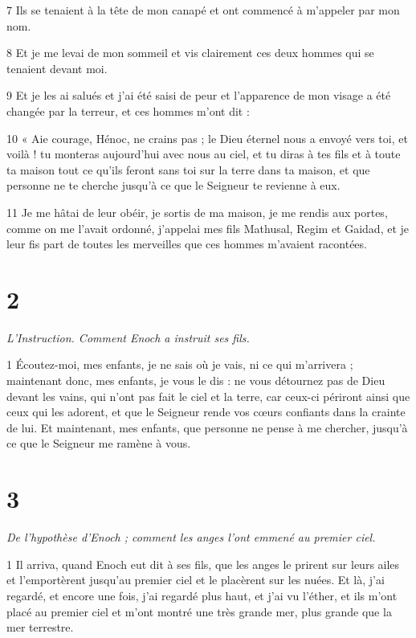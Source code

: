 \par 7 Ils se tenaient à la tête de mon canapé et ont commencé à m'appeler par mon nom.

\par 8 Et je me levai de mon sommeil et vis clairement ces deux hommes qui se tenaient devant moi.

\par 9 Et je les ai salués et j'ai été saisi de peur et l'apparence de mon visage a été changée par la terreur, et ces hommes m'ont dit :

\par 10 « Aie courage, Hénoc, ne crains pas ; le Dieu éternel nous a envoyé vers toi, et voilà ! tu monteras aujourd'hui avec nous au ciel, et tu diras à tes fils et à toute ta maison tout ce qu'ils feront sans toi sur la terre dans ta maison, et que personne ne te cherche jusqu'à ce que le Seigneur te revienne à eux.

\par 11 Je me hâtai de leur obéir, je sortis de ma maison, je me rendis aux portes, comme on me l'avait ordonné, j'appelai mes fils Mathusal, Regim et Gaidad, et je leur fis part de toutes les merveilles que ces hommes m'avaient racontées.

\chapter{2}

\par \textit{L'Instruction. Comment Enoch a instruit ses fils.}

\par 1 Écoutez-moi, mes enfants, je ne sais où je vais, ni ce qui m'arrivera ; maintenant donc, mes enfants, je vous le dis : ne vous détournez pas de Dieu devant les vains, qui n'ont pas fait le ciel et la terre, car ceux-ci périront ainsi que ceux qui les adorent, et que le Seigneur rende vos cœurs confiants dans la crainte de lui. Et maintenant, mes enfants, que personne ne pense à me chercher, jusqu'à ce que le Seigneur me ramène à vous.

\chapter{3}

\par \textit{De l'hypothèse d'Enoch ; comment les anges l'ont emmené au premier ciel.}

\par 1 Il arriva, quand Enoch eut dit à ses fils, que les anges le prirent sur leurs ailes et l'emportèrent jusqu'au premier ciel et le placèrent sur les nuées. Et là, j'ai regardé, et encore une fois, j'ai regardé plus haut, et j'ai vu l'éther, et ils m'ont placé au premier ciel et m'ont montré une très grande mer, plus grande que la mer terrestre.

